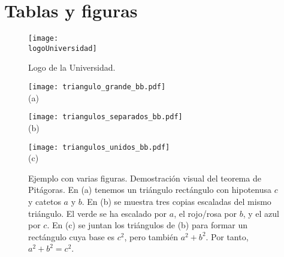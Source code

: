 \section{Tablas y figuras}

\begin{figure}
  \centering
  \texttt{[image: \\logoUniversidad]}
  \caption{Logo de la Universidad.}
  \label{fig:logo_universidad}
\end{figure}


\begin{figure}
   \centering

  \begin{minipage}{0.45\textwidth}
   \centering

     \texttt{[image: triangulo\_grande\_bb.pdf]}\\

    \footnotesize (a)
  \end{minipage}
  \hfill
  \begin{minipage}{0.45\textwidth}
   \centering
     \texttt{[image: triangulos\_separados\_bb.pdf]}\\

   \footnotesize (b)
  \end{minipage}

    \bigskip

    \texttt{[image: triangulos\_unidos\_bb.pdf]}\\
    \footnotesize (c)

  \caption{Ejemplo con varias figuras. Demostración visual del teorema de Pitágoras. En (a) tenemos un triángulo rectángulo con hipotenusa $c$ y catetos $a$ y $b$. En (b) se muestra tres copias escaladas del mismo triángulo. El verde se ha escalado por $a$, el rojo/rosa por $b$, y el azul por $c$. En (c) se juntan los triángulos de (b) para formar un rectángulo cuya base es $c^{2}$, pero también $a^{2} + b^{2}$. Por tanto, $a^{2} + b^{2} = c^{2}$.}\label{fig:teoremapitagoras}
\end{figure}

\newpage
